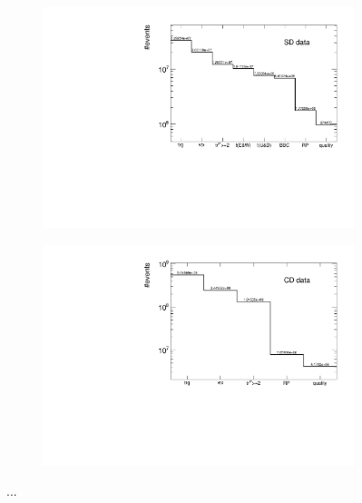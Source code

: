 \begin{figure}[H]
	\centering
	\parbox{0.484\textwidth}{
		\centering
		\begin{subfigure}[b]{\linewidth}{
				{\includegraphics[width=1.04\linewidth, page=1]{graphics/cutFlow/SDT.pdf}}}
		\end{subfigure}
	}
	\quad
	\parbox{0.484\textwidth}{
		\centering
		\begin{subfigure}[b]{\linewidth}{
				{\includegraphics[width=1.04\linewidth, page=1]{graphics/cutFlow/CPT2.pdf}}}
		\end{subfigure}
	}
	\caption[...]{...}
	\label{fig:selectionCutFlow}
\end{figure}
